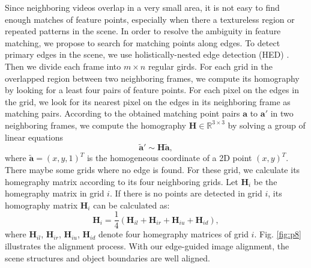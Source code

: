 \documentclass[conference]{IEEEtran}
\begin{document}
Since neighboring videos overlap in a very small area, it is not easy to find enough matches of feature points, especially when there a textureless region or repeated patterns in the scene. 
In order to resolve the ambiguity in feature matching, we propose to search for matching points along edges.
%
To detect primary edges in the scene, we use holistically-nested edge detection (HED) \cite{xie2015holistically}. 
Then we divide each frame into $m \times n$ regular girds. 
%
For each grid in the overlapped region between two neighboring frames, we compute its homography by looking for a least four pairs of feature points.
%
For each pixel on the edges in the grid, we look for its nearest pixel on the edges in its neighboring frame as matching pairs.  
%
According to the obtained matching point pairs $\mathbf{a}$ to $\mathbf{a}'$ in two neighboring frames, we compute the homography $\mathbf{H} \in \mathbb{R}^{3 \times 3}$ by solving a group of linear equations 
\begin{equation}
\widetilde{\textbf{a}}' \sim \mathbf{H} \widetilde{\textbf{a}},
\end{equation}
where $\widetilde{\mathbf{a}}=(x,y,1)^{T}$ is the homogeneous coordinate of a 2D point $(x,y)^{T}$.  
There maybe some grids where no edge is found. 
For these grid, we calculate its homegraphy matrix according to its four neighboring grids. 
Let $\textbf{H}_i$ be the homegraphy matrix in grid $i$.
If there is no points are detected in grid $i$, its homography matrix $\textbf{H}_{i}$ can be calculated as:
\begin{equation}
\textbf{H}_{i} = \frac{1}{4}\left(\textbf{H}_{il}+\textbf{H}_{ir}+\textbf{H}_{iu}+\textbf{H}_{id}\right),
\end{equation} 
where $\textbf{H}_{il}$, 
$\textbf{H}_{ir}$, 
$\textbf{H}_{iu}$, 
$\textbf{H}_{id}$ 
denote four homegraphy matrices of grid 
$i$.
Fig. \ref{fig:p8} illustrates the alignment process.
With our edge-guided image alignment, the scene structures and object boundaries are well aligned. 
\end{document}
